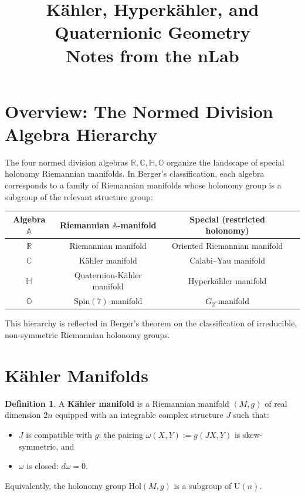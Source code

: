 \documentclass[12pt]{article}
\title{K\"{a}hler, Hyperk\"{a}hler, and Quaternionic Geometry\\
\large Notes from the nLab}
\author{}
\date{}
\theoremstyle{definition}
\newtheorem{definition}{Definition}[section]
\theoremstyle{plain}
\newcommand{\RR}{\mathbb{R}}
\newcommand{\CC}{\mathbb{C}}
\newcommand{\HH}{\mathbb{H}}
\newcommand{\OO}{\mathbb{O}}
\newcommand{\Spin}{\mathrm{Spin}}
\newcommand{\U}{\mathrm{U}}
\newcommand{\Hol}{\mathrm{Hol}}
\begin{document}
\maketitle
\tableofcontents

\newpage

\section{Overview: The Normed Division Algebra Hierarchy}

The four normed division algebras $\RR, \CC, \HH, \OO$ organize the landscape of special holonomy Riemannian manifolds. In Berger's classification, each algebra corresponds to a family of Riemannian manifolds whose holonomy group is a subgroup of the relevant structure group:

\begin{center}
\renewcommand{\arraystretch}{1.4}
\begin{tabular}{cccc}
\toprule
\textbf{Algebra} $\mathbb{A}$ & \textbf{Riemannian $\mathbb{A}$-manifold} & \textbf{Special (restricted holonomy)} \\
\midrule
$\RR$ & Riemannian manifold & Oriented Riemannian manifold \\
$\CC$ & K\"{a}hler manifold & Calabi--Yau manifold \\
$\HH$ & Quaternion-K\"{a}hler manifold & Hyperk\"{a}hler manifold \\
$\OO$ & $\Spin(7)$-manifold & $G_2$-manifold \\
\bottomrule
\end{tabular}
\end{center}

\medskip

This hierarchy is reflected in Berger's theorem on the classification of irreducible, non-symmetric Riemannian holonomy groups.

\section{K\"{a}hler Manifolds}

\begin{definition}
A \textbf{K\"{a}hler manifold} is a Riemannian manifold $(M, g)$ of real dimension $2n$ equipped with an integrable complex structure $J$ such that:
\begin{itemize}
  \item $J$ is compatible with $g$: the pairing $\omega(X, Y) := g(JX, Y)$ is skew-symmetric, and
  \item $\omega$ is closed: $d\omega = 0$.
\end{itemize}
Equivalently, the holonomy group $\Hol(M, g)$ is a subgroup of $\U(n)$.
\end{definition}
\end{document}
